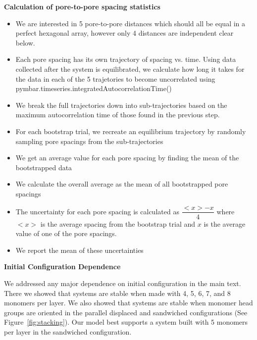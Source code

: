 \documentclass{article}
\begin{document}
  \textbf{Calculation of pore-to-pore spacing statistics}
  
  \color{red}{This is an outline of this section and will be reworded for clarity}
  \begin{itemize}
  	\item We are interested in 5 pore-to-pore distances which should all
	be equal in a perfect hexagonal array, however only 4 distances are independent
	clear below.
	\item Each pore spacing has its own trajectory of spacing vs. time.
	Using data collected after the system is equilibrated, we calculate how long it
	takes for the data in each of the 5 trajetories to become uncorrelated using
	pymbar.timeseries.integratedAutocorrelationTime() %
	\item We break the full trajectories down into sub-trajectories based
	on the maximum autocorrelation time of those found in the previous step.
	\item For each bootstrap trial, we recreate an equilibrium trajectory
	by randomly sampling pore spacings from the sub-trajectories 
	\item We get an average value for each pore spacing by finding the
	mean of the bootstrapped data
	\item We calculate the overall average as the mean of all
	bootstrapped pore spacings
	\item The uncertainty for each pore spacing is calculated as
	$\dfrac{<x> - x}{4}$ where $<x>$ is the average spacing from the bootstrap
	trial and $x$ is the average value of one of the pore spacings.
	\item We report the mean of these uncertainties
  \end{itemize}

  \begingroup
	\fontsize{14pt}{12pt}\selectfont
	\textbf{Initial Configuration Dependence}
  \endgroup

  \vspace{1em}
  We addressed any major dependence on initial configuration in the main text.
  There we showed that systems are stable when made with 4, 5, 6, 7, and 8
  monomers per layer. We also showed that systems are stable when monomer head
  groups are oriented in the parallel displaced and sandwiched configurations
  (See Figure~\ref{fig:stacking}). Our model best supports a system built with 5
  monomers per layer in the sandwiched configuration. 
\end{document}

